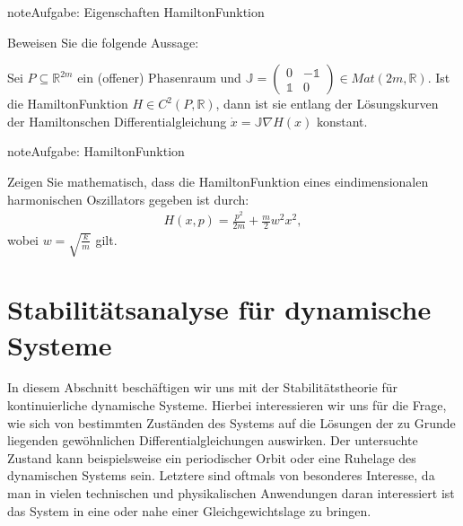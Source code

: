 \documentclass[letterpaper,10pt,german]{jupyterBook}
\begin{document}
\begin{sphinxadmonition}{note}{Aufgabe: Eigenschaften Hamilton\sphinxhyphen{}Funktion}

\sphinxAtStartPar
Beweisen Sie die folgende Aussage:

\sphinxAtStartPar
Sei \(P \subseteq \mathbb{R}^{2m}\) ein (offener) Phasenraum und \(\mathbb{J} = \begin{pmatrix} 0 & - 𝟙 \\ 𝟙 & 0 \end{pmatrix} \in Mat(2m, \mathbb{R})\). Ist die Hamilton\sphinxhyphen{}Funktion \(H \in C^2(P, \mathbb{R})\), dann ist sie entlang der Lösungskurven der Hamiltonschen Differentialgleichung \(\dot x = \mathbb{J} \nabla H(x)\) konstant.
\end{sphinxadmonition}

\begin{sphinxadmonition}{note}{Aufgabe: Hamilton\sphinxhyphen{}Funktion}

\sphinxAtStartPar
Zeigen Sie mathematisch, dass die Hamilton\sphinxhyphen{}Funktion eines eindimensionalen harmonischen Oszillators gegeben ist durch:
\begin{equation*}
\begin{split}H(x,p) = \frac{p^2}{2m} + \frac{m}{2} w^2 x^2,\end{split}
\end{equation*}
\sphinxAtStartPar
wobei \(w = \sqrt{\frac{k}{m}}\) gilt.
\end{sphinxadmonition}


\chapter{Stabilitätsanalyse für dynamische Systeme}
\label{\detokenize{odestability/stabilitaetsanalyse:stabilitatsanalyse-fur-dynamische-systeme}}\label{\detokenize{odestability/stabilitaetsanalyse::doc}}
\sphinxAtStartPar
In diesem Abschnitt beschäftigen wir uns mit der Stabilitätstheorie für kontinuierliche dynamische Systeme.
Hierbei interessieren wir uns für die Frage, wie sich  von bestimmten Zuständen des Systems auf die Lösungen der zu Grunde liegenden gewöhnlichen Differentialgleichungen auswirken.
Der untersuchte Zustand kann beispielsweise ein periodischer Orbit oder eine Ruhelage des dynamischen Systems sein.
Letztere sind oftmals von besonderes Interesse, da man in vielen technischen und physikalischen Anwendungen daran interessiert ist das System in eine oder nahe einer Gleichgewichtslage zu bringen.
\end{document}
